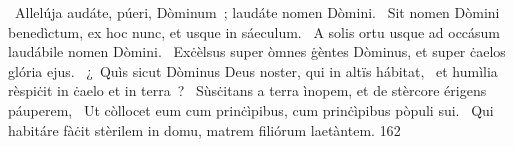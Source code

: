 {~Allelúja}
{%
audáte, púeri, Dòminum~; laudáte nomen Dòmini.
~Sit nomen Dòmini benedìctum, ex hoc nunc, et usque in sáeculum.
~A solis ortu usque ad occásum laudábile nomen Dòmini.
~Exċèlsus super òmnes ġèntes Dòminus, et super ċaelos glória ejus.
~¿~Quìs sicut Dòminus Deus noster, qui in altïs hábitat,
~et humìlia rèspiċit in ċaelo et in terra~?
~Sùsċitans a terra ìnopem, et de stèrcore érigens páuperem,
~Ut còllocet eum cum prinċìpibus, cum prinċìpibus pòpuli sui.
~Qui habitáre fàċit stèrilem in domu, matrem filiórum laetàntem.}
{16}{2}
